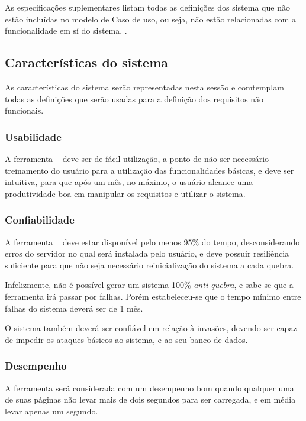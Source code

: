 As especificações suplementares listam todas as definições dos sistema que não estão incluídas no modelo de Caso de uso, ou seja, não estão relacionadas com a funcionalidade em sí do sistema, \cite{rup}.

\subsection{Características do sistema}
\label{subSection:suplementares_Caract_sistema}
As características do sistema serão representadas nesta sessão e comtemplam todas as definições que serão usadas para a definição dos requisitos não funcionais.

\subsubsection{Usabilidade}
	
	A ferramenta \nomeferramenta~ deve ser de fácil utilização, a ponto de não ser necessário treinamento do usuário para a utilização das funcionalidades básicas, e deve ser intuitiva, para que após um mês, no máximo, o usuário alcance uma produtividade boa em manipular os requisitos e utilizar o sistema.

\subsubsection{Confiabilidade}

	A ferramenta \nomeferramenta~ deve estar disponível pelo menos 95\% do tempo, desconsiderando erros do servidor no qual será instalada pelo usuário, e deve possuir resiliência suficiente para que não seja necessário reinicialização do sistema a cada quebra.

	Infelizmente, não é possível gerar um sistema 100\% \textit{anti-quebra}, e sabe-se que a ferramenta irá passar por falhas. Porém estabeleceu-se que o tempo mínimo entre falhas do sistema deverá ser de 1 mês.

	O sistema também deverá ser confiável em relação à invasões, devendo ser capaz de impedir os ataques básicos ao sistema, e ao seu banco de dados.

\subsubsection{Desempenho}

	A ferramenta será considerada com um desempenho bom quando qualquer uma de suas páginas não levar mais de dois segundos para ser carregada, e em média levar apenas um segundo.

